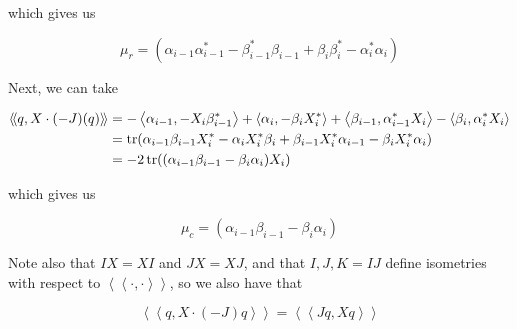 \documentclass{article}
\newcommand{\iinner}[1]{\left\langle\!\left\langle #1 \right\rangle\!\right\rangle}
\begin{document}
which gives us

\[\mu_r = (\alpha_{i-1}\alpha_{i-1}^* - \beta_{i-1}^*\beta_{i-1} + \beta_i\beta_i^* -\alpha_i^*\alpha_i)\]

Next, we can take

\begin{align*}
    \iinner{q, X\cdot (-J)(q)} &= -\inner{\alpha_{i-1}, -X_i\beta_{i-1}^*} + \inner{\alpha_i, -\beta_iX_i^*} + \inner{\beta_{i-1}, \alpha_{i-1}^*X_i} - \inner{\beta_i, \alpha_i^*X_i} \\
    &= \tr(\alpha_{i-1}\beta_{i-1}X_i^* - \alpha_iX_i^*\beta_i + \beta_{i-1}X_i^*\alpha_{i-1} - \beta_iX_i^*\alpha_i) \\
    &= -2\tr((\alpha_{i-1}\beta_{i-1} - \beta_i\alpha_i)X_i)
\end{align*}

which gives us

\[\mu_c = (\alpha_{i-1}\beta_{i-1} - \beta_i\alpha_i)\]

Note also that \(IX = XI\) and \(JX = XJ\), and that \(I, J, K=IJ\) define isometries with respect to \(\iinner{\cdot, \cdot}\), so we also have that

\[\iinner{q, X \cdot (-J)q} = \iinner{Jq, Xq}\]

\printbibliography
\end{document}
